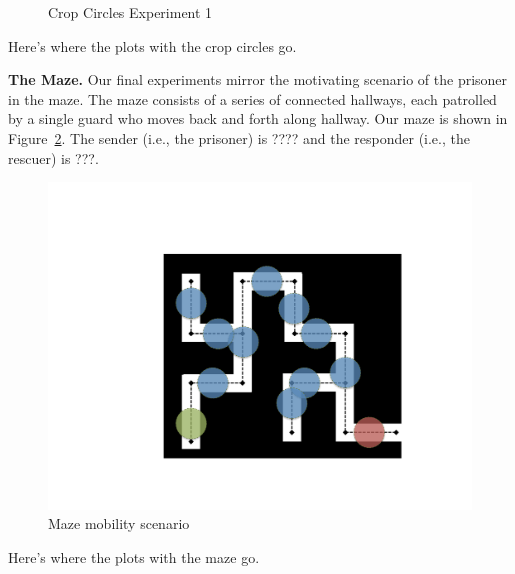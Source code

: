 \begin{figure}
\begin{center}
\end{center}
\vspace{-.4cm}
\caption{Crop Circles Experiment 1}\label{fig:exp1}
\vspace{-.35cm}
\end{figure}

{\color{red}Here's where the plots with the crop circles go.}

{\bf The Maze.} Our final experiments mirror the motivating scenario
of the prisoner in the maze. The maze consists of a series of
connected hallways, each patrolled by a single guard who moves back
and forth along hallway. Our maze is shown in
Figure~\ref{fig:maze}. {\color{red}The sender (i.e., the prisoner) is ???? and the
  responder (i.e., the rescuer) is ???.}
\begin{figure}
\begin{center}
\includegraphics[width=.9\columnwidth]{figures/newMaze.pdf}
\end{center}
\vspace{-.75cm}
\caption{Maze mobility scenario}
\label{fig:maze}
\vspace{-.5cm}
\end{figure}

{\color{red}Here's where the plots with the maze go.}